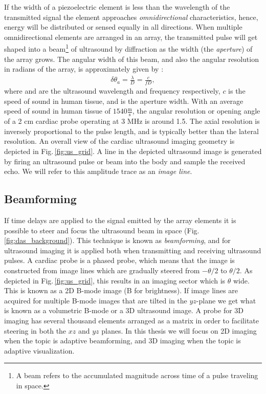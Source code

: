 If the width of a piezoelectric element is less than the wavelength of the transmitted signal the element approaches \textit{omnidirectional} characteristics, hence, energy will be distributed or sensed equally in all directions. When multiple omnidirectional elements are arranged in an array, the transmitted pulse will get shaped into a beam\footnote{A beam refers to the accumulated magnitude across time of a pulse traveling in space.} of ultrasound by diffraction as the width (the \textit{aperture}) of the array grows. The angular width of this beam, and also the angular resolution in radians of the array, is approximately given by \cite{AngelUltrasound}:
\begin{align}\label{eq:res}
\delta\theta_a = \frac{\lambda}{D} = \frac{c}{fD},
\end{align}
where  and  are the ultrasound wavelength and frequency respectively, $c$ is the speed of sound in human tissue, and  is the aperture width. With an average speed of sound in human tissue of $1540\frac{\text{m}}{\text{s}}$, the angular resolution or opening angle of a 2 cm cardiac probe operating at 3 MHz is around 1.5\degree. The axial resolution is inversely proportional to the pulse length, and is typically better than the lateral resolution. An overall view of the cardiac ultrasound imaging geometry is depicted in Fig.\,\ref{fig:us_grid}. A line in the depicted ultrasound image is generated by firing an ultrasound pulse or beam into the body and sample the received echo. We will refer to this amplitude trace as an \textit{image line}. 

\subsection{Beamforming}
If time delays are applied to the signal emitted by the array elements it is possible to steer and focus the ultrasound beam in space (Fig.\,\ref{fig:das_background}). This technique is known as \textit{beamforming}, and for ultrasound imaging it is applied both when transmitting and receiving ultrasound pulses. A cardiac probe is a phased probe, which means that the image is constructed from image lines which are gradually steered from $-\theta/2$ to $\theta/2$. As depicted in Fig.\,\ref{fig:us_grid}, this results in an imaging sector which is $\theta$ wide. This is known as a 2D B-mode image (B for brightness). If image lines are acquired for multiple B-mode images that are tilted in the $yz$-plane we get what is known as a volumetric B-mode or a 3D ultrasound image. A probe for 3D imaging has several thousand elements arranged as a matrix in order to facilitate steering in both the $xz$ and $yz$ planes. In this thesis we will focus on 2D imaging when the topic is adaptive beamforming, and 3D imaging when the topic is adaptive visualization.

